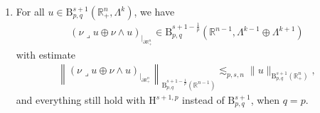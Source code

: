 \documentclass[AHL,Unicode,longabstracts,published]{cedram}
\newcommand{\bbR}{\mathbb{R}}
\newcommand{\rmH}{\mathrm{H}}%
\newcommand{\rmB}{\mathrm{B}}
\newcommand{\rmd}{\mathrm{d}}
\newcommand{\iprod}{\mathbin{\lrcorner}}
\begin{document}
\begin{theo}
\begin{enumerate}
\begin{align*}
\left\|\nu\iprod u_{|_{\partial\bbR^n_+}} \right\|_{\rmB^{s-\frac{1}{p}}_{p,q}\left(\bbR^{n-1}\right)}\lesssim_{p,s,n} \| u \|_{{\rmB}^{s}_{p,q}\left(\bbR^n_+\right)} + \left\| \delta u \right\|_{{\rmB}^{s}_{p,q}\left(\bbR^n_+\right)} .
\end{align*}
The same results holds with the corresponding estimate, for $u\in {\rmd}^{s}_{p,q}(\rmd,\bbR^{n}_+,\Lambda^k)$ we have a partial trace
\[
\nu\wedge u_{|_{\partial\bbR^n_+}}\in \rmB^{s-\frac{1}{p}}_{p,q}\left(\bbR^{n-1},\Lambda^{k+1}\right)
\]
such that~\eqref{eq:IntegbyPartNormTrace} is satisfied for all $\Psi\in \rmB^{1-s}_{p',q'}(\bbR^n_+, \Lambda^{k+1})$.
\item\label{theoA.1.3} For all $u\in {\rmB}^{s+1}_{p,q}(\bbR^{n}_+,\Lambda^k)$, we have
\begin{align*}
(\nu\iprod u\oplus\nu\wedge u)_{|_{\partial\bbR^n_+}}\in \rmB^{s+1-\frac{1}{p}}_{p,q} \left(\bbR^{n-1},\Lambda^{k-1}\oplus\Lambda^{k+1}\right)
\end{align*}
with estimate
\begin{align*}
\left\| (\nu\iprod u\oplus\nu\wedge u)_{|_{\partial\bbR^n_+}} \right\|_{\rmB^{s+1-\frac{1}{p}}_{p,q}\left(\bbR^{n-1}\right)} \lesssim_{p,s,n} \| u \|_{{\rmB}^{s+1}_{p,q}\left(\bbR^n_+\right)},
\end{align*}
and everything still hold with ${\rmH}^{s+1,p}$ instead of $\rmB^{s+1}_{p,q}$, when $q=p$.
\end{enumerate}
\end{theo}
\end{document}
